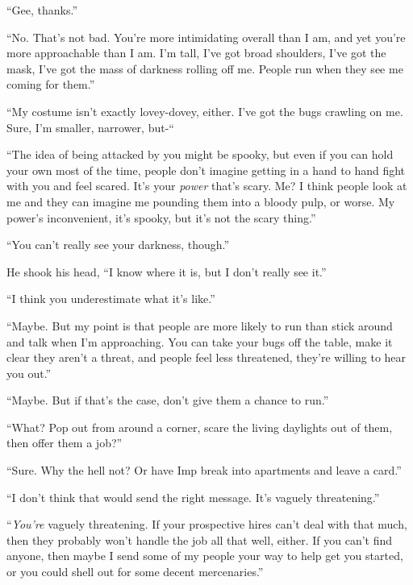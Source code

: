``Gee, thanks.''



``No.  That's not bad.  You're more intimidating overall than I am, and yet you're more approachable than I am.  I'm tall, I've got broad shoulders, I've got the mask, I've got the mass of darkness rolling off me.  People run when they see me coming for them.''



``My costume isn't exactly lovey-dovey, either.  I've got the bugs crawling on me.  Sure, I'm smaller, narrower, but-``



``The idea of being attacked by you might be spooky, but even if you can hold your own most of the time, people don't imagine getting in a hand to hand fight with you and feel scared.  It's your \emph{power} that's scary.  Me?  I think people look at me and they can imagine me pounding them into a bloody pulp, or worse.  My power's inconvenient, it's spooky, but it's not the scary thing.''



``You can't really see your darkness, though.''



He shook his head, ``I know where it is, but I don't really see it.''



``I think you underestimate what it's like.''



``Maybe.  But my point is that people are more likely to run than stick around and talk when I'm approaching.  You can take your bugs off the table, make it clear they aren't a threat, and people feel less threatened, they're willing to hear you out.''



``Maybe.  But if that's the case, don't give them a chance to run.''



``What?  Pop out from around a corner, scare the living daylights out of them, then offer them a job?''



``Sure.  Why the hell not?  Or have Imp break into apartments and leave a card.''



``I don't think that would send the right message.  It's vaguely threatening.''



``\emph{You're} vaguely threatening.  If your prospective hires can't deal with that much, then they probably won't handle the job all that well, either.  If you can't find anyone, then maybe I send some of my people your way to help get you started, or you could shell out for some decent mercenaries.''



